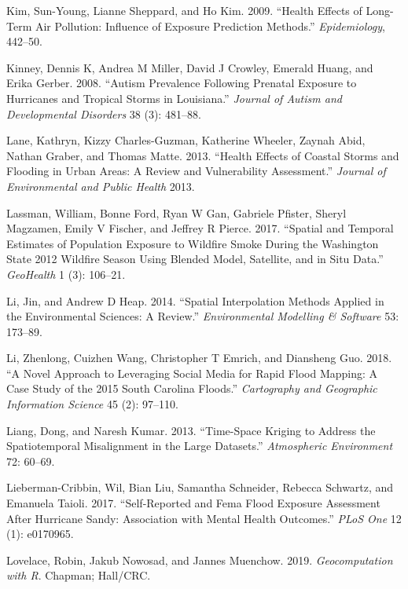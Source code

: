 \documentclass[
]{article}
\begin{document}
\leavevmode\hypertarget{ref-kim2009health}{}%
Kim, Sun-Young, Lianne Sheppard, and Ho Kim. 2009. ``Health Effects of
Long-Term Air Pollution: Influence of Exposure Prediction Methods.''
\emph{Epidemiology}, 442--50.

\leavevmode\hypertarget{ref-kinney2008autism}{}%
Kinney, Dennis K, Andrea M Miller, David J Crowley, Emerald Huang, and
Erika Gerber. 2008. ``Autism Prevalence Following Prenatal Exposure to
Hurricanes and Tropical Storms in Louisiana.'' \emph{Journal of Autism
and Developmental Disorders} 38 (3): 481--88.

\leavevmode\hypertarget{ref-lane2013health}{}%
Lane, Kathryn, Kizzy Charles-Guzman, Katherine Wheeler, Zaynah Abid,
Nathan Graber, and Thomas Matte. 2013. ``Health Effects of Coastal
Storms and Flooding in Urban Areas: A Review and Vulnerability
Assessment.'' \emph{Journal of Environmental and Public Health} 2013.

\leavevmode\hypertarget{ref-lassman2017spatial}{}%
Lassman, William, Bonne Ford, Ryan W Gan, Gabriele Pfister, Sheryl
Magzamen, Emily V Fischer, and Jeffrey R Pierce. 2017. ``Spatial and
Temporal Estimates of Population Exposure to Wildfire Smoke During the
Washington State 2012 Wildfire Season Using Blended Model, Satellite,
and in Situ Data.'' \emph{GeoHealth} 1 (3): 106--21.

\leavevmode\hypertarget{ref-li2014spatial}{}%
Li, Jin, and Andrew D Heap. 2014. ``Spatial Interpolation Methods
Applied in the Environmental Sciences: A Review.'' \emph{Environmental
Modelling \& Software} 53: 173--89.

\leavevmode\hypertarget{ref-li2018novel}{}%
Li, Zhenlong, Cuizhen Wang, Christopher T Emrich, and Diansheng Guo.
2018. ``A Novel Approach to Leveraging Social Media for Rapid Flood
Mapping: A Case Study of the 2015 South Carolina Floods.''
\emph{Cartography and Geographic Information Science} 45 (2): 97--110.

\leavevmode\hypertarget{ref-liang2013time}{}%
Liang, Dong, and Naresh Kumar. 2013. ``Time-Space Kriging to Address the
Spatiotemporal Misalignment in the Large Datasets.'' \emph{Atmospheric
Environment} 72: 60--69.

\leavevmode\hypertarget{ref-lieberman2017self}{}%
Lieberman-Cribbin, Wil, Bian Liu, Samantha Schneider, Rebecca Schwartz,
and Emanuela Taioli. 2017. ``Self-Reported and Fema Flood Exposure
Assessment After Hurricane Sandy: Association with Mental Health
Outcomes.'' \emph{PLoS One} 12 (1): e0170965.

\leavevmode\hypertarget{ref-lovelace2019geocomputation}{}%
Lovelace, Robin, Jakub Nowosad, and Jannes Muenchow. 2019.
\emph{Geocomputation with R}. Chapman; Hall/CRC.
\end{document}
